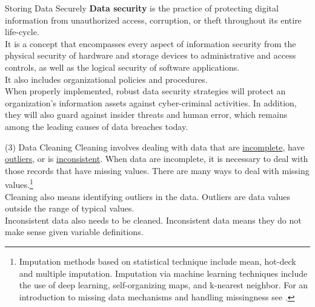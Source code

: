 \documentclass[pdf]{beamer}
\newcommand{\empr}[1]{{\color{franklinblue}\textbf{#1}}}
\theoremstyle{remark}
\theoremstyle{definition}
\begin{document}
\begin{frame}{Storing Data Securely}
\empr{Data security} is the practice of protecting digital information from unauthorized access, corruption, or theft throughout its entire life-cycle. \\
\vspace{1.5ex}
It is a concept that encompasses every aspect of information security from the physical security of hardware and storage devices to administrative and access controls, as well as the logical security of software applications. \\
\vspace{1.5ex}
It also includes organizational policies and procedures. \\
\vspace{1.5ex}
When properly implemented, robust data security strategies will protect an organization's information assets against cyber-criminal activities.  In addition, they will also guard against insider threats and human error, which remains among the leading causes of data breaches today. 
\end{frame}


\begin{frame}[t]{(3) Data Cleaning}
Cleaning involves dealing with data that are \underline{incomplete}, have \underline{outliers}, or is \underline{inconsistent}. When data are incomplete, it is necessary to deal with those records that have missing values. There are many ways to deal with missing values.\footnote{Imputation methods based on statistical technique include mean, hot-deck and multiple imputation.  Imputation via machine learning techniques include the use of deep learning, self-organizing maps, and k-nearest neighbor. For an introduction to missing data mechanisms and handling missingness see \cite{jakobsen2017}.}\\
\vspace{1.5ex} 
Cleaning also means identifying outliers in the data. Outliers are data values outside the range of typical values. \\
\vspace{1.5ex} 
Inconsistent data also needs to be cleaned. Inconsistent data means they do not make sense given variable definitions.
\end{frame}
\end{document}
